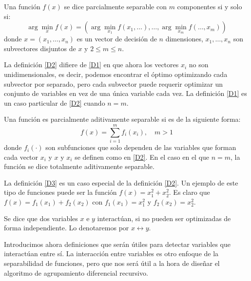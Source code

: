 \begin{definicion}
\label{D2}
Una función \(f(x)\) se dice parcialmente separable con \( m \) componentes si y solo si:
\begin{equation}
\arg \min_{x} f(x) =
\left(
\arg \min_{x_1} f(x_1, \ldots), \ldots, \arg \min_{x_m} f(\ldots, x_m)
\right)
\label{EQ2}
\end{equation}
donde \( x = (x_1, \ldots, x_n) \) es un vector de decisión de \( n \) dimensiones, \( x_1, \ldots, x_n \) son subvectores disjuntos de \( x \) y \( 2 \leq m \leq n \).

La definición \ref{D2} difiere de \ref{D1} en que ahora los vectores \( x_i \) no son unidimensionales, es decir, podemos encontrar el óptimo optimizando cada subvector por separado, pero cada subvector puede requerir optimizar un conjunto de variables en vez de una única variable cada vez. La definición \ref{D1} es un caso particular de \ref{D2} cuando \( n = m \).
\end{definicion}

\begin{definicion}
\label{D3}
Una función es parcialmente aditivamente separable si es de la siguiente forma:
\begin{equation}
f(x) = \sum_{i=1}^{m} f_i(x_i), \quad m > 1
\label{EQ3}
\end{equation}
donde \( f_i(\cdot) \) son subfunciones que solo dependen de las variables que forman cada vector \( x_i \) y \( x \) y \( x_i \) se definen como en \ref{D2}. En el caso en el que \( n = m \), la función se dice totalmente aditivamente separable.
\end{definicion}

La definición \ref{D3} es un caso especial de la definición \ref{D2}. Un ejemplo de este tipo de funciones puede ser la función \( f(x) = x_1^2 + x_2^2 \). Es claro que \( f(x) = f_1(x_1) + f_2(x_2) \) con \( f_1(x_1) = x_1^2 \) y \( f_2(x_2) = x_2^2 \).

\begin{definicion}
\label{D4}
Se dice que dos variables \( x \) e \( y \) interactúan, si no pueden ser optimizadas de forma independiente. Lo denotaremos por \( x \leftrightarrow y \).
\end{definicion}

Introducimos ahora definiciones que serán útiles para detectar variables que interactúan entre sí. La interacción entre variables es otro enfoque de la separabilidad de funciones, pero que nos será útil a la hora de diseñar el algoritmo de agrupamiento diferencial recursivo.

